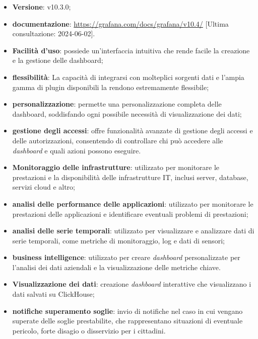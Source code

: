 \begin{itemize}
	\item \textbf{Versione}: v10.3.0;
	\item \textbf{documentazione}: \url{https://grafana.com/docs/grafana/v10.4/} [Ultima consultazione: 2024-06-02].
\end{itemize}

\begin{itemize}
	\item \textbf{Facilità d'uso}: possiede un'interfaccia intuitiva che rende facile la creazione e la gestione delle dashboard;
	\item \textbf{flessibilità}: La capacità di integrarsi con molteplici sorgenti dati e l'ampia gamma di plugin disponibili la rendono estremamente flessibile;
	\item \textbf{personalizzazione}: permette una personalizzazione completa delle dashboard, soddisfando ogni possibile necessità di visualizzazione dei dati;
	\item \textbf{gestione degli accessi}: offre funzionalità avanzate di gestione degli accessi e delle autorizzazioni, consentendo di controllare chi può accedere alle \textit{dashboard} e quali azioni possono eseguire.
\end{itemize}
\begin{itemize}
	\item \textbf{Monitoraggio delle infrastrutture}: utilizzato per monitorare le prestazioni e la disponibilità delle infrastrutture IT, inclusi server, database, servizi cloud e altro;
	\item \textbf{analisi delle performance delle applicazioni}: utilizzato per monitorare le prestazioni delle applicazioni e identificare eventuali problemi di prestazioni;
	\item \textbf{analisi delle serie temporali}: utilizzato per visualizzare e analizzare dati di serie temporali, come metriche di monitoraggio, log e dati di sensori;
	\item \textbf{business intelligence}: utilizzato per creare \textit{dashboard} personalizzate per l'analisi dei dati aziendali e la visualizzazione delle metriche chiave.
\end{itemize}
\begin{itemize}
	\item \textbf{Visualizzazione dei dati}: creazione \textit{dashboard} interattive che visualizzano i dati salvati su ClickHouse;
	\item \textbf{notifiche superamento soglie}: invio di notifiche nel caso in cui vengano superate delle soglie prestabilite, che rappresentano situazioni di eventuale pericolo, forte disagio o disservizio per i cittadini.
\end{itemize}
